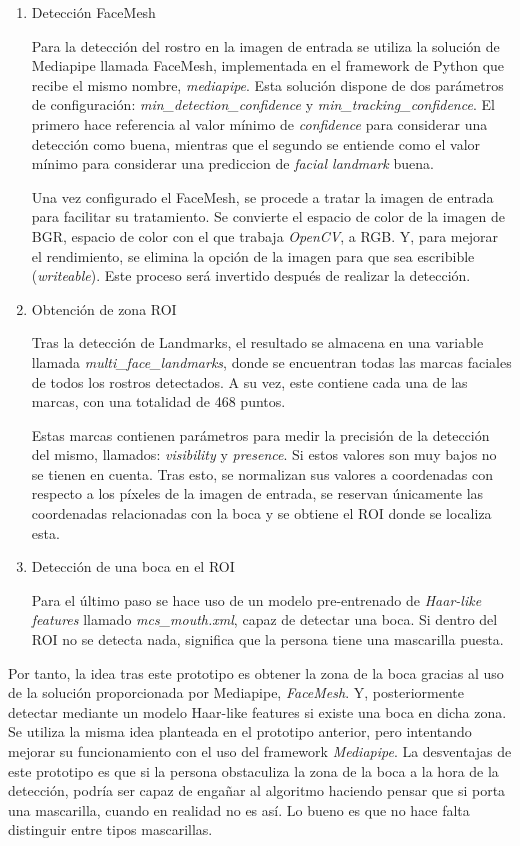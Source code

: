 \begin{enumerate}
	\item Detección FaceMesh
	
	Para la detección del rostro en la imagen de entrada se utiliza la solución de Mediapipe llamada FaceMesh, implementada en el framework de Python que recibe el mismo nombre, \textit{mediapipe}. Esta solución dispone de dos parámetros de configuración: \textit{min\_detection\_confidence} y \textit{min\_tracking\_confidence}. El primero hace referencia al valor mínimo de \textit{confidence} para considerar una detección como buena, mientras que el segundo se entiende como el valor mínimo para considerar una prediccion de \textit{facial landmark} buena.
	
	Una vez configurado el FaceMesh, se procede a tratar la imagen de entrada para facilitar su tratamiento. Se convierte el espacio de color de la imagen de BGR, espacio de color con el que trabaja \textit{OpenCV}, a RGB. Y, para mejorar el rendimiento, se elimina la opción de la imagen para que sea escribible (\textit{writeable}). Este proceso será invertido después de realizar la detección.
	
	\item Obtención de zona ROI
	
	Tras la detección de Landmarks, el resultado se almacena en una variable llamada \textit{multi\_face\_landmarks}, donde se encuentran todas las marcas faciales de todos los rostros detectados. A su vez, este contiene cada una de las marcas, con una totalidad de 468 puntos.

	Estas marcas contienen parámetros para medir la precisión de la detección del mismo, llamados: \textit{visibility} y \textit{presence}. Si estos valores son muy bajos no se tienen en cuenta. Tras esto, se normalizan sus valores a coordenadas con respecto a los píxeles de la imagen de entrada, se reservan únicamente las coordenadas relacionadas con la boca y se obtiene el ROI donde se localiza esta.
	
	\item Detección de una boca en el ROI 
	
	Para el último paso se hace uso de un modelo pre-entrenado de \textit{Haar-like features} llamado \textit{mcs\_mouth.xml}, capaz de detectar una boca. Si dentro del ROI no se detecta nada, significa que la persona tiene una mascarilla puesta.
\end{enumerate}

Por tanto, la idea tras este prototipo es obtener la zona de la boca gracias al uso de la solución proporcionada por Mediapipe, \textit{FaceMesh}. Y, posteriormente detectar mediante un modelo Haar-like features si existe una boca en dicha zona. Se utiliza la misma idea planteada en el prototipo anterior, pero intentando mejorar su funcionamiento con el uso del framework \textit{Mediapipe}. La desventajas de este prototipo es que si la persona obstaculiza la zona de la boca a la hora de la detección, podría ser capaz de engañar al algoritmo haciendo pensar que si porta una mascarilla, cuando en realidad no es así. Lo bueno es que no hace falta distinguir entre tipos mascarillas.

